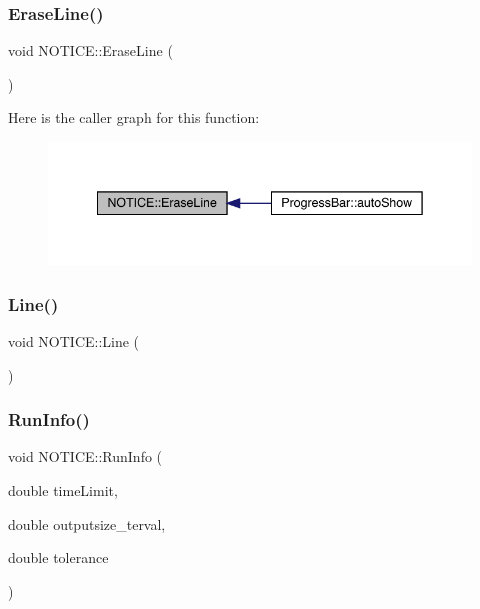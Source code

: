 \subsubsection{\texorpdfstring{Erase\+Line()}{EraseLine()}}
{\footnotesize\ttfamily void N\+O\+T\+I\+C\+E\+::\+Erase\+Line (\begin{DoxyParamCaption}{ }\end{DoxyParamCaption})\hspace{0.3cm}{\ttfamily [inline]}}

Here is the caller graph for this function\+:
\nopagebreak
\begin{figure}[H]
\begin{center}
\leavevmode
\includegraphics[width=342pt]{namespace_n_o_t_i_c_e_a46fcf4944d7c1d3cc4d821297b0e4bf8_icgraph}
\end{center}
\end{figure}
\mbox{\label{namespace_n_o_t_i_c_e_a9536e3b7bb1f9b6af83b1a5cdf3a56d3}} 
\subsubsection{\texorpdfstring{Line()}{Line()}}
{\footnotesize\ttfamily void N\+O\+T\+I\+C\+E\+::\+Line (\begin{DoxyParamCaption}{ }\end{DoxyParamCaption})\hspace{0.3cm}{\ttfamily [inline]}}

\mbox{\label{namespace_n_o_t_i_c_e_ab85b7138c5f1deaeeedad94b7bad2477}} 
\subsubsection{\texorpdfstring{Run\+Info()}{RunInfo()}}
{\footnotesize\ttfamily void N\+O\+T\+I\+C\+E\+::\+Run\+Info (\begin{DoxyParamCaption}\item[{double}]{time\+Limit,  }\item[{double}]{outputsize\+\_\+terval,  }\item[{double}]{tolerance }\end{DoxyParamCaption})\hspace{0.3cm}{\ttfamily [inline]}}

